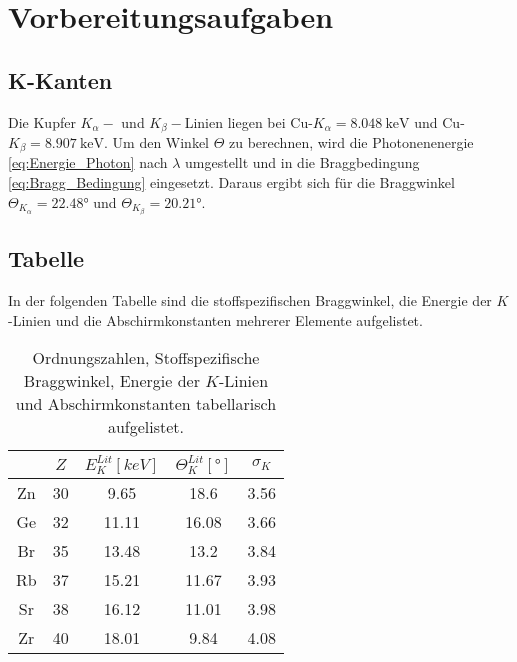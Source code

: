 \section{Vorbereitungsaufgaben}
\label{sec:Vorbereitungsaufgaben}

\subsection{K-Kanten}

Die Kupfer $K_α-$ und $K_β-$Linien liegen bei Cu-$K_α = \SI{8.048}{\kilo\eV}$ und Cu-$K_β = \SI{8.907}{\kilo\eV}$\cite{energie_k}.
Um den Winkel $Θ$ zu berechnen, wird die Photonenenergie \eqref{eq:Energie_Photon} nach $λ$ umgestellt und in die Braggbedingung \eqref{eq:Bragg_Bedingung} eingesetzt.
Daraus ergibt sich für die Braggwinkel $Θ_{K_α} = 22.48°$ und $Θ_{K_β} = 20.21°$.


\subsection{Tabelle}

In der folgenden Tabelle sind die stoffspezifischen Braggwinkel, die Energie der $K$-Linien und die Abschirmkonstanten mehrerer Elemente aufgelistet\cite{energie_k}.
\begin{table}
    \centering
    \caption{Ordnungszahlen, Stoffspezifische Braggwinkel, Energie der $K$-Linien und Abschirmkonstanten tabellarisch aufgelistet.}
    \begin{tabular}{|c|c|c|c|c|}
        \toprule
        {} & {$Z$} & {$E_{K}^{Lit}\left[\unit{keV}\right]$\cite{energie_k}} & {$\Theta_{K}^{Lit}\left[\unit{°}\right]$} & {$\sigma_{K}$}\\
        \midrule
        Zn & 30 & 9.65 & 18.6 & 3.56 \\
        Ge & 32 & 11.11 & 16.08 & 3.66 \\
        Br & 35 & 13.48 & 13.2 & 3.84 \\
        Rb & 37 & 15.21 & 11.67 & 3.93 \\
        Sr & 38 & 16.12 & 11.01 & 3.98 \\
        Zr & 40 & 18.01 & 9.84 & 4.08 \\
        \bottomrule
    \end{tabular}
\end{table}